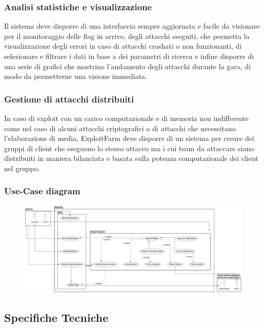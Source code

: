 \documentclass[11pt]{article}
\begin{document}
\subsubsection{Analisi statistiche e visualizzazione}
Il sistema deve disporre di una interfaccia sempre aggiornata e facile da visionare per il monitoraggio delle flag in arrivo, degli attacchi eseguiti, che permetta la visualizzazione degli errori in caso di attacchi crashati o non funzionanti, di selezionare e filtrare i dati in base a dei parametri di ricerca e infine disporre di una serie di grafici che mostrino l'andamento degli attacchi durante la gara, di modo da permetterne una visione immediata.
\subsubsection{Gestione di attacchi distribuiti}
In caso di exploit con un carico computazionale e di memoria non indifferente come nel caso di alcuni attacchi criptografici o di attacchi che necessitano l'elaborazione di media, ExploitFarm deve disporre di un sistema per creare dei gruppi di client che eseguono lo stesso attacco ma i cui team da attaccare siano distribuiti in maniera bilanciata e basata sulla potenza computazionale dei client nel gruppo.
\subsubsection{Use-Case diagram}
    \begin{figure}[H]
    	\centering
    	\includegraphics[width=1\textwidth]{general_use_case.png}
	\end{figure}
\subsection{Specifiche Tecniche}
\end{document}
